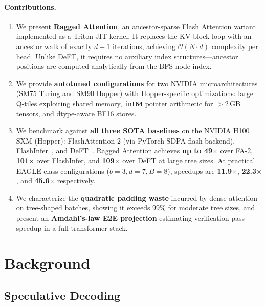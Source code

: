 \documentclass{article}
\newcommand{\method}{Ragged Attention}
\newcommand{\bigO}[1]{\mathcal{O}(#1)}
\newcommand{\numtokens}{N}
\newcommand{\depth}{d}
\newcommand{\branching}{b}
\newcommand{\batchsize}{B}
\begin{document}
\paragraph{Contributions.}
\begin{enumerate}[leftmargin=*,itemsep=2pt]
  \item We present \textbf{\method{}}, an ancestor-sparse Flash
    Attention variant implemented as a Triton JIT kernel.
    It replaces the KV-block loop with an ancestor walk of exactly
    $\depth + 1$ iterations, achieving $\bigO{\numtokens \cdot \depth}$
    complexity per head.  Unlike DeFT, it requires no auxiliary index
    structures---ancestor positions are computed analytically from the
    BFS node index.
  \item We provide \textbf{autotuned configurations} for two NVIDIA
    microarchitectures (SM75 Turing and SM90 Hopper) with
    Hopper-specific optimizations: large Q-tiles exploiting
    shared memory, \texttt{int64} pointer arithmetic for $>$2\,GB tensors,
    and dtype-aware BF16 stores.
  \item We benchmark against \textbf{all three SOTA baselines} on
    the NVIDIA H100 SXM (Hopper):
    FlashAttention-2 (via PyTorch SDPA flash backend),
    FlashInfer~\cite{ye2025flashinfer}, and
    DeFT~\cite{yao2024deft}.
    \method{} achieves \textbf{up to 49$\times$} over FA-2,
    \textbf{101$\times$} over FlashInfer, and
    \textbf{109$\times$} over DeFT at large tree sizes.
    At practical EAGLE-class configurations
    ($\branching{=}3, \depth{=}7, \batchsize{=}8$), speedups are
    \textbf{11.9$\times$}, \textbf{22.3$\times$}, and
    \textbf{45.6$\times$} respectively.
  \item We characterize the \textbf{quadratic padding waste} incurred by
    dense attention on tree-shaped batches, showing it exceeds
    $99\%$ for moderate tree sizes, and present an
    \textbf{Amdahl's-law E2E projection} estimating verification-pass
    speedup in a full transformer stack.
\end{enumerate}

\section{Background}\label{sec:background}

\subsection{Speculative Decoding}
\end{document}

